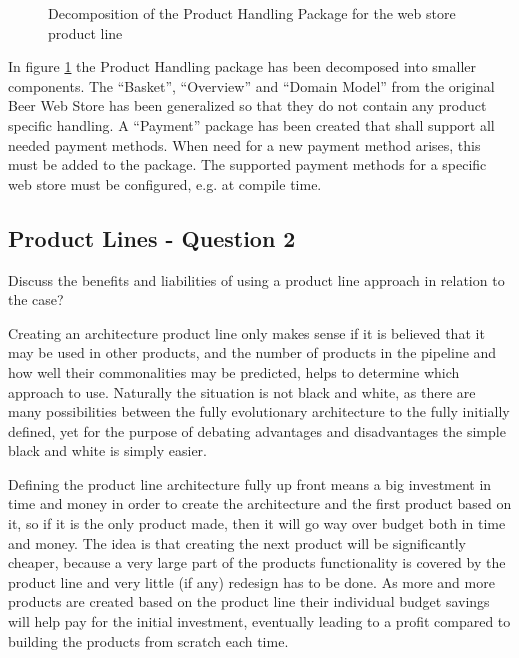 \begin{figure}[!htb]
\centerline{}
\caption{Decomposition of the Product Handling Package for the web store product line}
\label{fig:pl_package_ph}
\end{figure}

In figure \ref{fig:pl_package_ph} the Product Handling package has been decomposed
into smaller components. The ``Basket'', ``Overview'' and ``Domain Model'' from the
original Beer Web Store has been generalized so that they do not contain any product
specific handling. A ``Payment'' package has been created that shall support all
needed payment methods. When need for a new payment method arises, this must be added
to the package. The supported payment methods for a specific web store must be
configured, e.g. at compile time.


\subsection{Product Lines - Question 2}
\label{sec:pl_q2}
\begin{question}
Discuss the benefits and liabilities of using a product line
approach in relation to the case?
\end{question}

Creating an architecture product line only makes sense if it is believed that it may be used in other products, and the number of products in the pipeline and how well their commonalities may be predicted, helps to determine which approach to use. Naturally the situation is not black and white, as there are many possibilities between the fully evolutionary architecture to the fully initially defined, yet for the purpose of debating advantages and disadvantages the simple black and white is simply easier.

Defining the product line architecture fully up front means a big investment in time and money in order to create the architecture and the first product based on it, so if it is the only product made, then it will go way over budget both in time and money. The idea is that creating the next product will be significantly cheaper, because a very large part of the products functionality is covered by the product line and very little (if any) redesign has to be done. As more and more products are created based on the product line their individual budget savings will help pay for the initial investment, eventually leading to a profit compared to building the products from scratch each time.

